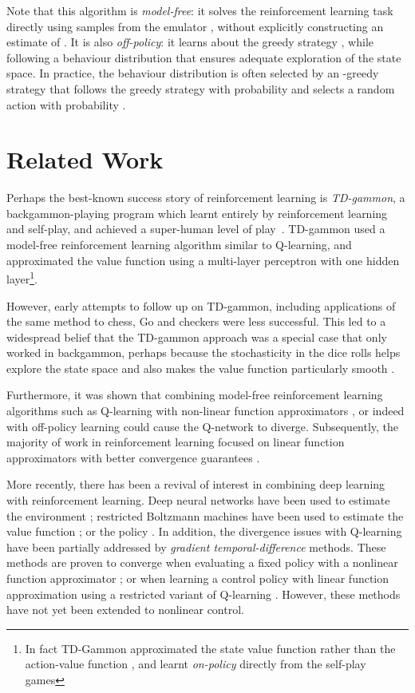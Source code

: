 \documentclass{article} \usepackage{nips13submit_e,times}
\begin{document}
Note that this algorithm is \emph{model-free}: it solves the reinforcement learning task directly using samples from the emulator , without explicitly constructing an estimate of . It is also \emph{off-policy}: it learns about the greedy strategy , while following a behaviour distribution that ensures adequate exploration of the state space. In practice, the behaviour distribution is often selected by an -greedy strategy that follows the greedy strategy with probability  and selects a random action with probability .

\section{Related Work}

Perhaps the best-known success story of reinforcement learning is \emph{TD-gammon}, a backgammon-playing program which learnt entirely by reinforcement learning and self-play, and achieved a super-human level of play~\cite{tesauro-95-backgammon}. TD-gammon used a model-free reinforcement learning algorithm similar to Q-learning, and approximated the value function using a multi-layer perceptron with one hidden layer\footnote{In fact TD-Gammon approximated the state value function  rather than the action-value function , and learnt \emph{on-policy} directly from the self-play games}. 

However, early attempts to follow up on TD-gammon, including applications of the same method to chess, Go and checkers were less successful. This led to a widespread belief that the TD-gammon approach was a special case that only worked in backgammon, perhaps because the stochasticity in the dice rolls helps explore the state space and also makes the value function particularly smooth \cite{pollack:td-gammon}.

Furthermore, it was shown that combining model-free reinforcement learning algorithms such as Q-learning with non-linear function approximators \cite{tsitsiklis:td-convergence}, or indeed with off-policy learning \cite{baird:residual} could cause the Q-network to diverge. Subsequently, the majority of work in reinforcement learning focused on linear function approximators with better convergence guarantees \cite{tsitsiklis:td-convergence}.

More recently, there has been a revival of interest in combining deep learning with reinforcement learning. Deep neural networks have been used to estimate the environment ; restricted Boltzmann machines have been used to estimate the value function \cite{sallans:rbm}; or the policy \cite{heess:energy-based}. In addition, the divergence issues with Q-learning have been partially addressed by \emph{gradient temporal-difference} methods. These methods are proven to converge when evaluating a fixed policy with a nonlinear function approximator \cite{maei:nonlinear}; or when learning a control policy with linear function approximation using a restricted variant of Q-learning \cite{maei:gq}. However, these methods have not yet been extended to nonlinear control.
\end{document}
